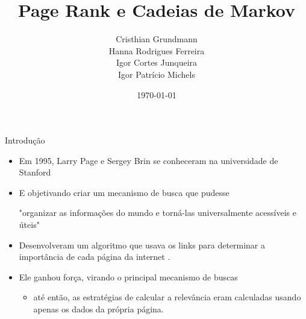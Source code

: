 \documentclass{beamer}
\title{Page Rank e Cadeias de Markov}
\author{
Cristhian Grundmann\\
Hanna Rodrigues Ferreira \\
Igor Cortes Junqueira \\
Igor Patrício Michels }
\date{\today}
\begin{document}
\maketitle

\begin{frame}{Introdução}
\begin{itemize}

\item Em 1995, Larry Page e Sergey Brin se conheceram na universidade de Stanford

\vspace{2pt}

\item E objetivando criar um mecanismo de busca que pudesse

\vspace{3pt}

\begin{center}
    "organizar as informações do mundo e torná-las universalmente acessíveis e úteis"
\end{center}

\vspace{2pt}

\item Desenvolveram um algoritmo que usava os links para determinar a importância de cada página da internet \cite{google}.

\vspace{2pt}

\item Ele ganhou força, virando o principal mecanismo de buscas

\begin{itemize}
    \item até então, as estratégias de calcular a relevância eram calculadas usando apenas os dados da própria página.
\end{itemize}



\end{itemize}
\end{frame}
\end{document}
